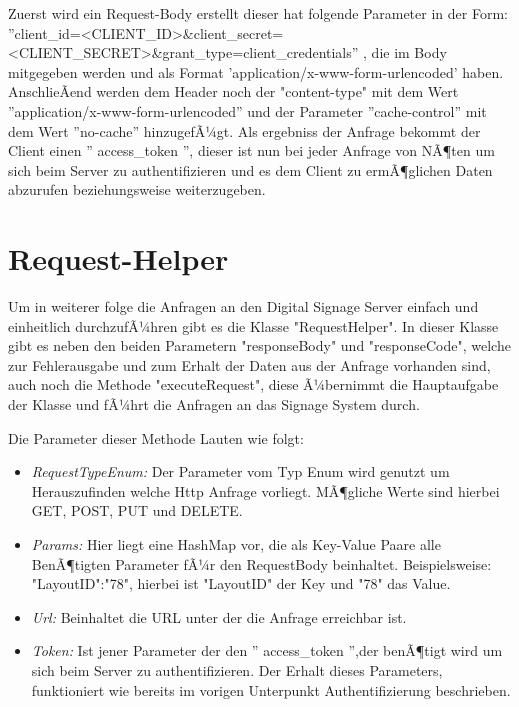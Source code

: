 Zuerst wird ein Request-Body erstellt dieser hat folgende Parameter in der Form: 
 ''client\_id=<CLIENT\_ID>\&client\_secret=<CLIENT\_SECRET>\&grant\_type=client\_credentials''
, die im Body mitgegeben werden und als Format 'application/x-www-form-urlencoded'  haben. AnschlieÃend werden dem Header noch der "content-type" mit dem Wert ''application/x-www-form-urlencoded'' und der Parameter ''cache-control'' mit dem Wert ''no-cache'' hinzugefÃ¼gt. Als ergebniss der Anfrage bekommt der Client einen '' access\_token '', dieser ist nun bei jeder Anfrage von NÃ¶ten um sich beim Server zu authentifizieren und es dem Client zu ermÃ¶glichen Daten abzurufen beziehungsweise weiterzugeben.

\section{Request-Helper}
Um in weiterer folge die Anfragen an den Digital Signage Server einfach und einheitlich durchzufÃ¼hren gibt es die Klasse "RequestHelper". In dieser Klasse gibt es neben den beiden Parametern "responseBody" und "responseCode", welche zur Fehlerausgabe und zum Erhalt der Daten aus der Anfrage vorhanden sind, auch noch die Methode "executeRequest", diese Ã¼bernimmt die Hauptaufgabe der Klasse und fÃ¼hrt die Anfragen an das Signage System durch.

Die Parameter dieser Methode Lauten wie folgt:

\begin{itemize}
	\item {\em RequestTypeEnum:} Der Parameter vom Typ Enum wird genutzt um Herauszufinden welche Http Anfrage vorliegt. MÃ¶gliche Werte sind hierbei GET, POST, PUT und DELETE.
	
	\item {\em Params:} Hier liegt eine HashMap vor, die als Key-Value Paare alle BenÃ¶tigten Parameter fÃ¼r den RequestBody beinhaltet. Beispielsweise: "LayoutID":"78", hierbei ist "LayoutID" der Key und "78" das Value.
		
	\item {\em Url:} Beinhaltet die URL unter der die Anfrage erreichbar ist. 
	
	\item {\em Token:} Ist jener Parameter der den '' access\_token '',der benÃ¶tigt wird um sich beim Server zu authentifizieren. Der Erhalt dieses Parameters, funktioniert wie bereits im vorigen Unterpunkt Authentifizierung beschrieben.
	
\end{itemize}

